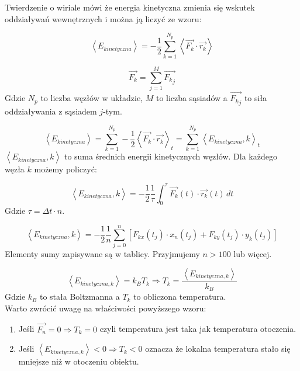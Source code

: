 \documentclass[12pt, letterpaper]{report}
\begin{document}
    Twierdzenie o wiriale mówi że energia kinetyczna zmienia się wskutek oddziaływań wewnętrznych i można ją 
    liczyć ze wzoru:

    \begin{equation}
        \left< E_{kinetyczna} \right>  = 
         - \frac{1}{2} \sum_{k = 1}^{N_p} \left< \vec{F_k} \cdot \vec{r_k} \right>
    \end{equation}

    \begin{equation}
        \vec{F_k} = \sum_{j = 1}^{M} \vec{{F_k}_j}
    \end{equation}
    Gdzie $N_p$ to liczba węzłów w układzie, $M$ to liczba sąsiadów a $\vec{{F_k}_j}$ to siła oddziaływania z sąsiadem $j$-tym.

    \begin{equation}
        \left< E_{kinetyczna} \right> = 
        \sum_{k = 1}^{N_p} -\frac{1}{2} \left< \vec{F_k} \cdot \vec{r_k} \right>_t =
        \sum_{k = 1}^{N_p} \left< E_{kinetyczna} , k \right>_t
    \end{equation}
    $\left< E_{kinetyczna} , k \right>$ to suma średnich energii kinetycznych węzłów. Dla każdego węzła $k$ możemy policzyć:

    \begin{equation}
        \left< E_{kinetyczna} , k \right> = 
        -\frac{1}{2} \frac{1}{\tau} \int_{0}^{\tau} \vec{F_k}(t) \cdot \vec{r_k}(t) \, dt
    \end{equation}
    Gdzie $\tau = \Delta t \cdot n$.

    \begin{equation}
        \left< E_{kinetyczna} , k \right> = 
        -\frac{1}{2} \frac{1}{n} \sum_{j = 0}^{n} \left[  F_{kx}(t_j) \cdot x_n(t_j) + F_{ky}(t_j) \cdot y_k(t_j) \right]
    \end{equation}
    Elementy sumy zapisywane są w tablicy. Przyjmujemy $n > 100$ lub więcej. 

    \begin{equation}
        \left< E_{kinetyczna, k} \right> = k_B T_k \Rightarrow T_k = \frac{\left< E_{kinetyczna, k} \right>}{k_B}
    \end{equation}
    Gdzie $k_B$ to stała Boltzmanna a $T_k$ to obliczona temperatura. \\

    Warto zwrócić uwagę na właściwości powyższego wzoru:
    \begin{enumerate}
        \item Jeśli $\vec{F_n} = 0 \Rightarrow T_k = 0$ czyli temperatura jest taka jak temperatura otoczenia.
        \item Jeśli $\left< E_{kinetyczna, k} \right> < 0 \Rightarrow T_k < 0$ oznacza że lokalna 
        temperatura stało się mniejsze niż w otoczeniu obiektu.
    \end{enumerate}
\end{document}
